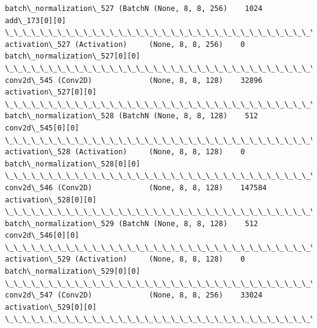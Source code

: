 \documentclass[11pt]{article}
\begin{document}
\begin{Verbatim}[commandchars=\\\{\}]
batch\_normalization\_527 (BatchN (None, 8, 8, 256)    1024        add\_173[0][0]                    
\_\_\_\_\_\_\_\_\_\_\_\_\_\_\_\_\_\_\_\_\_\_\_\_\_\_\_\_\_\_\_\_\_\_\_\_\_\_\_\_\_\_\_\_\_\_\_\_\_\_\_\_\_\_\_\_\_\_\_\_\_\_\_\_\_\_\_\_\_\_\_\_\_\_\_\_\_\_\_\_\_\_\_\_\_\_\_\_\_\_\_\_\_\_\_\_\_\_
activation\_527 (Activation)     (None, 8, 8, 256)    0           batch\_normalization\_527[0][0]    
\_\_\_\_\_\_\_\_\_\_\_\_\_\_\_\_\_\_\_\_\_\_\_\_\_\_\_\_\_\_\_\_\_\_\_\_\_\_\_\_\_\_\_\_\_\_\_\_\_\_\_\_\_\_\_\_\_\_\_\_\_\_\_\_\_\_\_\_\_\_\_\_\_\_\_\_\_\_\_\_\_\_\_\_\_\_\_\_\_\_\_\_\_\_\_\_\_\_
conv2d\_545 (Conv2D)             (None, 8, 8, 128)    32896       activation\_527[0][0]             
\_\_\_\_\_\_\_\_\_\_\_\_\_\_\_\_\_\_\_\_\_\_\_\_\_\_\_\_\_\_\_\_\_\_\_\_\_\_\_\_\_\_\_\_\_\_\_\_\_\_\_\_\_\_\_\_\_\_\_\_\_\_\_\_\_\_\_\_\_\_\_\_\_\_\_\_\_\_\_\_\_\_\_\_\_\_\_\_\_\_\_\_\_\_\_\_\_\_
batch\_normalization\_528 (BatchN (None, 8, 8, 128)    512         conv2d\_545[0][0]                 
\_\_\_\_\_\_\_\_\_\_\_\_\_\_\_\_\_\_\_\_\_\_\_\_\_\_\_\_\_\_\_\_\_\_\_\_\_\_\_\_\_\_\_\_\_\_\_\_\_\_\_\_\_\_\_\_\_\_\_\_\_\_\_\_\_\_\_\_\_\_\_\_\_\_\_\_\_\_\_\_\_\_\_\_\_\_\_\_\_\_\_\_\_\_\_\_\_\_
activation\_528 (Activation)     (None, 8, 8, 128)    0           batch\_normalization\_528[0][0]    
\_\_\_\_\_\_\_\_\_\_\_\_\_\_\_\_\_\_\_\_\_\_\_\_\_\_\_\_\_\_\_\_\_\_\_\_\_\_\_\_\_\_\_\_\_\_\_\_\_\_\_\_\_\_\_\_\_\_\_\_\_\_\_\_\_\_\_\_\_\_\_\_\_\_\_\_\_\_\_\_\_\_\_\_\_\_\_\_\_\_\_\_\_\_\_\_\_\_
conv2d\_546 (Conv2D)             (None, 8, 8, 128)    147584      activation\_528[0][0]             
\_\_\_\_\_\_\_\_\_\_\_\_\_\_\_\_\_\_\_\_\_\_\_\_\_\_\_\_\_\_\_\_\_\_\_\_\_\_\_\_\_\_\_\_\_\_\_\_\_\_\_\_\_\_\_\_\_\_\_\_\_\_\_\_\_\_\_\_\_\_\_\_\_\_\_\_\_\_\_\_\_\_\_\_\_\_\_\_\_\_\_\_\_\_\_\_\_\_
batch\_normalization\_529 (BatchN (None, 8, 8, 128)    512         conv2d\_546[0][0]                 
\_\_\_\_\_\_\_\_\_\_\_\_\_\_\_\_\_\_\_\_\_\_\_\_\_\_\_\_\_\_\_\_\_\_\_\_\_\_\_\_\_\_\_\_\_\_\_\_\_\_\_\_\_\_\_\_\_\_\_\_\_\_\_\_\_\_\_\_\_\_\_\_\_\_\_\_\_\_\_\_\_\_\_\_\_\_\_\_\_\_\_\_\_\_\_\_\_\_
activation\_529 (Activation)     (None, 8, 8, 128)    0           batch\_normalization\_529[0][0]    
\_\_\_\_\_\_\_\_\_\_\_\_\_\_\_\_\_\_\_\_\_\_\_\_\_\_\_\_\_\_\_\_\_\_\_\_\_\_\_\_\_\_\_\_\_\_\_\_\_\_\_\_\_\_\_\_\_\_\_\_\_\_\_\_\_\_\_\_\_\_\_\_\_\_\_\_\_\_\_\_\_\_\_\_\_\_\_\_\_\_\_\_\_\_\_\_\_\_
conv2d\_547 (Conv2D)             (None, 8, 8, 256)    33024       activation\_529[0][0]             
\_\_\_\_\_\_\_\_\_\_\_\_\_\_\_\_\_\_\_\_\_\_\_\_\_\_\_\_\_\_\_\_\_\_\_\_\_\_\_\_\_\_\_\_\_\_\_\_\_\_\_\_\_\_\_\_\_\_\_\_\_\_\_\_\_\_\_\_\_\_\_\_\_\_\_\_\_\_\_\_\_\_\_\_\_\_\_\_\_\_\_\_\_\_\_\_\_\_

\end{Verbatim}
\end{document}
